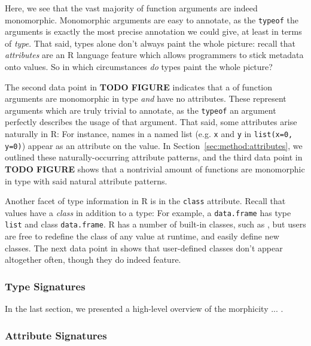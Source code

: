 \documentclass[acmsmall,10pt,review,anonymous]{acmart}\settopmatter{printfolios=true,printccs=false,printacmref=false}
\begin{document}
Here, we see that the vast majority of function arguments are indeed monomorphic.
Monomorphic arguments are easy to annotate, as the {\tt typeof} the arguments is exactly the most precise annotation we could give, at least in terms of \textit{type}.
That said, types alone don't always paint the whole picture:
recall that \textit{attributes} are an R language feature which allows programmers to stick metadata onto values.
So in which circumstances \textit{do} types paint the whole picture?

The second data point in \textbf{TODO FIGURE} indicates that a
 of function arguments are monomorphic in type \textit{and}
have no attributes.  These represent arguments which are truly trivial to
annotate, as the {\tt typeof} an argument perfectly describes the usage of
that argument.  That said, some attributes arise naturally in R: For
instance, names in a named list (e.g. {\tt x} and {\tt y} in {\tt list(x=0,
  y=0)}) appear as an attribute on the value.  In
Section~\ref{sec:method:attributes}, we outlined these naturally-occurring
attribute patterns, and the third data point in \textbf{TODO FIGURE} shows
that a nontrivial amount of functions are monomorphic in type with said
natural attribute patterns.

Another facet of type information in R is in the {\tt class} attribute.
Recall that values have a \textit{class} in addition to a type: For example,
a {\tt data.frame} has type {\tt list} and class {\tt data.frame}.
 R has a number of built-in classes, such as
, but users are free to redefine the class of any value at
runtime, and easily define new classes.  The next data point in
 shows that user-defined classes don't appear altogether often,
though they do indeed feature.  


\subsubsection{Type Signatures}

In the last section, we presented a high-level overview of the morphicity ... .

\subsubsection{Attribute Signatures}
\end{document}
